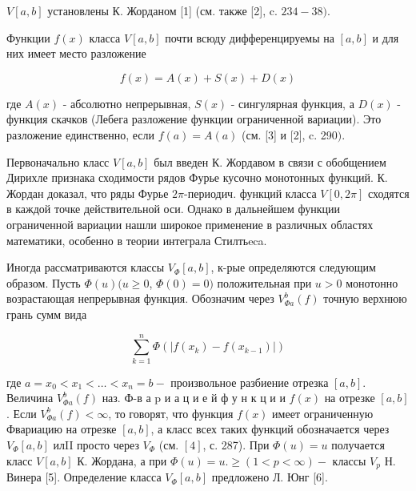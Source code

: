 \documentclass[10pt]{article}
\begin{document}
$V[a, b]$ установлены К. Жорданом [1] (см. также [2], c. $234-38)$.



Функции $f(x)$ класса $V[a, b]$ почти всюду дифференцируемы на $[a, b]$ и для них имеет место разложение



\[

f(x)=A(x)+S(x)+D(x)

\]



где $A(x)$ - абсолютно непрерывная, $S(x)$ - сингулярная функция, а $D(x)$ - функция скачков (Лебега разложение функции ограниченной вариации). Это разложение единственно, если $f(a)=A(a)$ (см. [3] и [2], c. 290$)$.



Первоначально класс $V[a, b]$ был введен К. Жордавом в связи с обобщением Дирихле признака сходимости рядов Фурье кусочно монотонных функций. К. Жордан доказал, что ряды Фурье $2 \pi$-периодич. функций класса $V[0,2 \pi]$ сходятся в каждой точке действительной оси. Однако в дальнейшем функции ограниченной вариации нашли широкое применение в различных областях математики, особенно в теории интеграла Стилтьeca.



Иногда рассматриваются классы $V_{\Phi}[a, b]$, к-рые определяются следующим образом. Пусть $\Phi(u)(u \geqslant 0$, $\Phi(0)=0)$ положительная при $u>0$ монотонно возрастающая непрерывная функция. Обозначим через $V_{\Phi a}^{b}(f)$ точную верхнюю грань сумм вида



\[

\sum_{k=1}^{n} \Phi\left(\left|f\left(x_{k}\right)-f\left(x_{k-1}\right)\right|\right)

\]



где $a=x_{0}<x_{1}<\ldots<x_{n}=b-$ произвольное разбиение отрезка $[a, b]$. Величина $V_{\Phi a}^{b}(f)$ наз. Ф-в а $\mathrm{p}$ и а ц и е й $ф$ у н к ц и и $f(x)$ на отрезке $[a, b]$. Если $V_{\Phi a}^{b}(f)<\infty$, то говорят, что функция $f(x)$ имеет ограниченную Фвариацию на отрезке $[a, b]$, а класс всех таких функций обозначается через $V_{\Phi}[a, b]$ илII просто через $V_{\Phi}$ (см. $[4]$, с. 287). При $\Phi(u)=u$ получается класс $V[a, b]$ К. Жордана, а при $\Phi(u)=u . \geqslant(1<p<\infty)-$ классы $V_{p}$ Н. Винера [5]. Определение класса $V_{\Phi}[a, b]$ предложено Л. Юнг [6].
\end{document}
